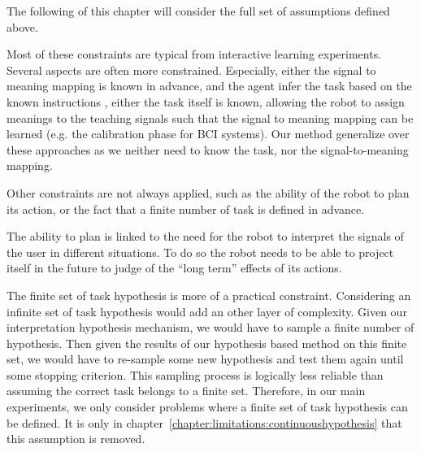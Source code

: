 
\transition

The following of this chapter will consider the full set of assumptions defined above.

Most of these constraints are typical from interactive learning experiments. Several aspects are often more constrained. Especially, either the signal to meaning mapping is known in advance, and the agent infer the task based on the known instructions \cite{kaplan2002robotic,chernova09jair,knox2009interactively}, either the task itself is known, allowing the robot to assign meanings to the teaching signals such that the signal to meaning mapping can be learned (e.g. the calibration phase for BCI systems). Our method generalize over these approaches as we neither need to know the task, nor the signal-to-meaning mapping.

Other constraints are not always applied, such as the ability of the robot to plan its action, or the fact that a finite number of task is defined in advance.

The ability to plan is linked to the need for the robot to interpret the signals of the user in different situations. To do so the robot needs to be able to project itself in the future to judge of the ``long term'' effects of its actions. 


The finite set of task hypothesis is more of a practical constraint. Considering an infinite set of task hypothesis would add an other layer of complexity. Given our interpretation hypothesis mechanism, we would have to sample a finite number of hypothesis. Then given the results of our hypothesis based method on this finite set, we would have to re-sample some new hypothesis and test them again until some stopping criterion. This sampling process is logically less reliable than assuming the correct task belongs to a finite set. Therefore, in our main experiments, we only consider problems where a finite set of task hypothesis can be defined. It is only in chapter~\ref{chapter:limitations:continuoushypothesis} that this assumption is removed.

